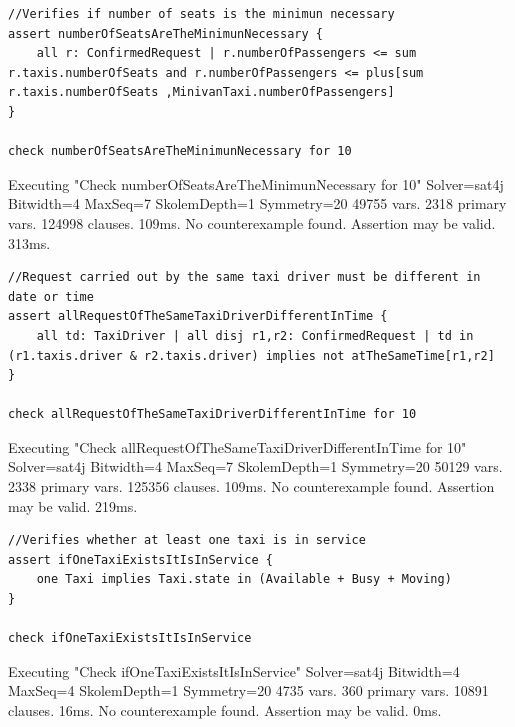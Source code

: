 \begin{lstlisting}[breaklines=true,showstringspaces=false]
//Verifies if number of seats is the minimun necessary 
assert numberOfSeatsAreTheMinimunNecessary { 	
	all r: ConfirmedRequest | r.numberOfPassengers <= sum r.taxis.numberOfSeats and r.numberOfPassengers <= plus[sum r.taxis.numberOfSeats ,MinivanTaxi.numberOfPassengers] 
}

check numberOfSeatsAreTheMinimunNecessary for 10
\end{lstlisting}


\begin{framed}
Executing "Check numberOfSeatsAreTheMinimunNecessary for 10"    
Solver=sat4j Bitwidth=4 MaxSeq=7 SkolemDepth=1 Symmetry=20    
49755 vars. 2318 primary vars. 124998 clauses. 109ms.    
No counterexample found. Assertion may be valid. 313ms. 
\end{framed}

\begin{lstlisting}[breaklines=true,showstringspaces=false]
//Request carried out by the same taxi driver must be different in date or time 
assert allRequestOfTheSameTaxiDriverDifferentInTime { 	
	all td: TaxiDriver | all disj r1,r2: ConfirmedRequest | td in (r1.taxis.driver & r2.taxis.driver) implies not atTheSameTime[r1,r2] 
}

check allRequestOfTheSameTaxiDriverDifferentInTime for 10
\end{lstlisting}


\begin{framed}
Executing "Check allRequestOfTheSameTaxiDriverDifferentInTime for 10"    
Solver=sat4j Bitwidth=4 MaxSeq=7 SkolemDepth=1 Symmetry=20    
50129 vars. 2338 primary vars. 125356 clauses. 109ms.    
No counterexample found. Assertion may be valid. 219ms.

\end{framed}

\begin{lstlisting}[breaklines=true,showstringspaces=false]
//Verifies whether at least one taxi is in service 
assert ifOneTaxiExistsItIsInService { 	
	one Taxi implies Taxi.state in (Available + Busy + Moving) 
}

check ifOneTaxiExistsItIsInService
\end{lstlisting}


\begin{framed}
Executing "Check ifOneTaxiExistsItIsInService"    
Solver=sat4j Bitwidth=4 MaxSeq=4 SkolemDepth=1 Symmetry=20    
4735 vars. 360 primary vars. 10891 clauses. 16ms.    
No counterexample found. Assertion may be valid. 0ms.
\end{framed}

